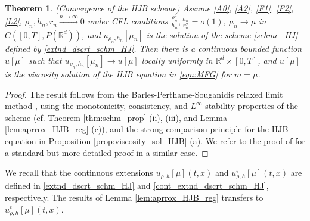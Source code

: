 \documentclass[a4paper,  twoside, 10pt, leqno]{amsart}
\newcommand{\rd}{\mathbb{R}^d}
\newtheorem{thm}{Theorem}[section]
\theoremstyle{remark}
\theoremstyle{definition}
\begin{document}
\begin{thm} \label{HJ_convergence}
    (Convergence of the HJB   scheme)  
    Assume \ref{A0}, \ref{A2},  \ref{F1}, \ref{F2}, \ref{L2}, $\rho_{n},h_{n}, r_{n} \xrightarrow{n \to \infty}  0$  under CFL conditions
    $\frac{\rho_{n}^{2}}{h_{n}} ,\frac{h_{n}}{r_{n}^{\sigma}} = o ( 1 )$, 
    $\mu_n\rightarrow \mu$ in $C([0,T],P(\rd))$, 
    and $u_{\rho_{n},h_{n}}[\mu_n]$ is the solution of the scheme \eqref{schme_HJ} defined by \eqref{extnd_dscrt_schm_HJ}.  Then there is a continuous bounded function $u[\mu]$ such that $u_{\rho_{n},h_{n}}[\mu_n]\rightarrow u[\mu]$
     locally uniformly  in $\rd \times [ 0,T ]$, and  $u[\mu]$ is the viscosity solution of the HJB equation in \eqref{eqn:MFG} for $m=\mu$.
\end{thm}
\begin{proof}
    The result follows from the  Barles-Perthame-Souganidis relaxed limit method \cite{barles1991convergence},  using the monotonicity, consistency, and $L^\infty$-stability properties of the scheme (cf. Theorem \ref{thm:schm_prop} (ii), (iii), and Lemma \ref{lem:aprrox_HJB_reg} (c)), 
and the strong comparison principle
    for the HJB equation in Proposition \ref{prop:viscosity_sol_HJB} (a). 
    We refer to the proof of \cite[Theorem 3.3]{carliniSilva2014semi1st} for a standard but more detailed proof in a similar case. 
\end{proof}


We recall that the continuous extensions $u_{\rho, h} [ \mu ] ( t,x )$ and 
$u_{\rho, h}^{\epsilon} [ \mu ] ( t,x )$ are defined in 
\eqref{extnd_dscrt_schm_HJ} and \eqref{cont_extnd_dscrt_schm_HJ}, 
respectively. 
The results of Lemma \ref{lem:aprrox_HJB_reg} transfers to $u_{\rho,h}^{\epsilon} [ \mu ] ( t,x )$.
\end{document}
